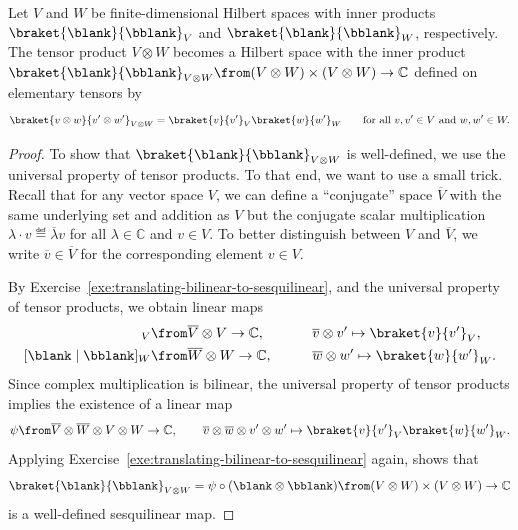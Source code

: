 \documentclass[a4paper,oneside, 12pt]{amsart}
\begin{document}
\begin{proposition}\label{prop:unitary-on-tensor-product}
  Let \( V \) and \( W \) be finite-dimensional Hilbert spaces with inner products \( \braket{\blank}{\bblank}_V \) and \( \braket{\blank}{\bblank}_W \), respectively.
  The tensor product \( V \otimes W \) becomes a Hilbert space with the inner product \(\braket{\blank}{\bblank}_{V \otimes W} \from (V \otimes W) \times (V \otimes W) \to \mathbb{C}\) defined on elementary tensors by
  \begin{equation}
    \braket{v \otimes w}{v' \otimes w'}_{V \otimes W} = \braket{v}{v'}_V \braket{w}{w'}_W \qquad \text{for all } v, v' \in V \text{ and }w, w' \in W.
  \end{equation}
\end{proposition}
\begin{proof}
  To show that \( \braket{\blank}{\bblank}_{V \otimes W} \) is well-defined, we use the universal property of tensor products.
  To that end, we want to use a small trick.
  Recall that for any vector space \(V\), we can define a ``conjugate'' space \(\overline{V}\) with the same underlying set and addition as \(V\) but the conjugate scalar multiplication \(\lambda \cdot v \eqdef \overline{\lambda}v\) for all \(\lambda \in \mathbb{C}\)  and \(v \in V\).
  To better distinguish between \(V\) and \(\overline{V}\), we write \(\overline{v} \in \overline{V}\) for the corresponding element \(v\in V\).

  By Exercise~\ref{exe:translating-bilinear-to-sesquilinear},
  and the universal property of tensor products, we obtain linear maps
  \begin{align*}
    [ \blank \mid \bblank]_{V} &\from \overline{V}\otimes V \to \mathbb{C}, \qquad &&\overline{v} \otimes v' \mapsto \braket{v}{v'}_{V},\\
    [ \blank \mid \bblank]_{W} &\from \overline{W}\otimes W \to \mathbb{C}, \qquad &&\overline{w} \otimes w' \mapsto \braket{w}{w'}_{W}.
  \end{align*}
  Since complex multiplication is bilinear, the universal property of tensor products implies the existence of a linear map
  \begin{equation*}
    \psi \from \overline{V} \otimes \overline{W} \otimes V \otimes W \to \mathbb{C},\qquad
    \overline{v} \otimes \overline{w} \otimes v' \otimes w' \mapsto \braket{v}{v'}_{V}\braket{w}{w'}_{W}.
  \end{equation*}
  Applying Exercise~\ref{exe:translating-bilinear-to-sesquilinear} again, shows that
  \begin{equation*}
    \braket{\blank}{\bblank}_{V \otimes W} =  \psi \circ ( \blank \otimes \bblank) \from (V \otimes W) \times (V \otimes W) \to \mathbb{C}
  \end{equation*}
  is a well-defined sesquilinear map.


\end{proof}
\end{document}

